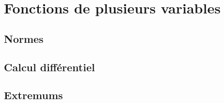 \section{Fonctions de plusieurs variables} 
\newcommand{\multivar}{/home/robin/ENSEIGN/Cours/MathBiologie/L3-ENS-Math1/Exercices/MultiVar}

\subsection{Normes}





\subsection{Calcul différentiel}





\subsection{Extremums}



